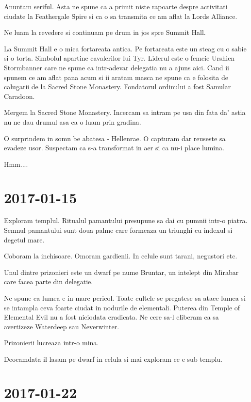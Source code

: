 \documentclass[12pt,oneside]{book}
\begin{document}
Anuntam seriful. Asta ne spune ca a primit niste rapoarte despre activitati ciudate
la Feathergale Spire si ca o sa transmita ce am aflat la Lords Alliance.

Ne luam la revedere si continuam pe drum in jos spre Summit Hall.

La Summit Hall e o mica fortareata antica. Pe fortareata este un steag cu o sabie si
o torta. Simbolul apartine cavalerilor lui Tyr. Liderul este o femeie Urshien 
Stormbanner care ne spune ca intr-adevar delegatia nu a ajuns aici. Cand ii spunem
ce am aflat pana acum si ii aratam masca ne spune ca e folosita de calugarii de la 
Sacred Stone Monastery.
Fondatorul ordinului a fost Samular Caradoon.


Mergem la Sacred Stone Monastery. Incercam sa intram pe usa din fata da' astia
nu ne dau drumul asa ca o luam prin gradina.

O surprindem in somn be abatesa - Hellenrae. O capturam dar reuseste sa evadeze usor.
Suspectam ca s-a transformat in aer si ca nu-i place lumina. 

Hmm....

\section{2017-01-15}

Exploram templul. Ritualul pamantului presupune sa dai cu pumnii intr-o piatra.
Semnul pamantului sunt doua palme care formeaza un triunghi cu indexul si degetul
mare.

Coboram la inchisoare. Omoram gardienii. In celule sunt tarani, negustori etc.

Unul dintre prizonieri este un dwarf pe nume Bruntar, un intelept din Mirabar care
facea parte din delegatie. 

Ne spune ca lumea e in mare pericol. Toate cultele se pregatesc sa  atace lumea si 
se intampla ceva foarte ciudat in nodurile de  elementali. Puterea din Temple of 
Elemental Evil nu a fost niciodata eradicata. Ne cere sa-l eliberam ca sa avertizeze 
Waterdeep sau Neverwinter.

Prizonierii lucreaza intr-o mina.

Deocamdata il lasam pe dwarf in celula si mai exploram ce e sub templu.
	
\newpage

\section{2017-01-22}
\end{document}

